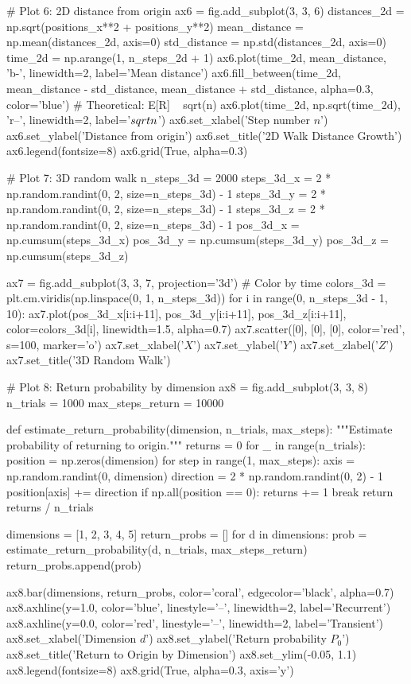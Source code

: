 \documentclass[a4paper, 11pt]{article}
\begin{document}
\begin{pycode}
# Plot 6: 2D distance from origin
ax6 = fig.add_subplot(3, 3, 6)
distances_2d = np.sqrt(positions_x**2 + positions_y**2)
mean_distance = np.mean(distances_2d, axis=0)
std_distance = np.std(distances_2d, axis=0)
time_2d = np.arange(1, n_steps_2d + 1)
ax6.plot(time_2d, mean_distance, 'b-', linewidth=2, label='Mean distance')
ax6.fill_between(time_2d, mean_distance - std_distance, mean_distance + std_distance,
                  alpha=0.3, color='blue')
# Theoretical: E[R] ~ sqrt(n)
ax6.plot(time_2d, np.sqrt(time_2d), 'r--', linewidth=2, label='$\\sqrt{n}$')
ax6.set_xlabel('Step number $n$')
ax6.set_ylabel('Distance from origin')
ax6.set_title('2D Walk Distance Growth')
ax6.legend(fontsize=8)
ax6.grid(True, alpha=0.3)

# Plot 7: 3D random walk
n_steps_3d = 2000
steps_3d_x = 2 * np.random.randint(0, 2, size=n_steps_3d) - 1
steps_3d_y = 2 * np.random.randint(0, 2, size=n_steps_3d) - 1
steps_3d_z = 2 * np.random.randint(0, 2, size=n_steps_3d) - 1
pos_3d_x = np.cumsum(steps_3d_x)
pos_3d_y = np.cumsum(steps_3d_y)
pos_3d_z = np.cumsum(steps_3d_z)

ax7 = fig.add_subplot(3, 3, 7, projection='3d')
# Color by time
colors_3d = plt.cm.viridis(np.linspace(0, 1, n_steps_3d))
for i in range(0, n_steps_3d - 1, 10):
    ax7.plot(pos_3d_x[i:i+11], pos_3d_y[i:i+11], pos_3d_z[i:i+11],
             color=colors_3d[i], linewidth=1.5, alpha=0.7)
ax7.scatter([0], [0], [0], color='red', s=100, marker='o')
ax7.set_xlabel('$X$')
ax7.set_ylabel('$Y$')
ax7.set_zlabel('$Z$')
ax7.set_title('3D Random Walk')

# Plot 8: Return probability by dimension
ax8 = fig.add_subplot(3, 3, 8)
n_trials = 1000
max_steps_return = 10000

def estimate_return_probability(dimension, n_trials, max_steps):
    """Estimate probability of returning to origin."""
    returns = 0
    for _ in range(n_trials):
        position = np.zeros(dimension)
        for step in range(1, max_steps):
            axis = np.random.randint(0, dimension)
            direction = 2 * np.random.randint(0, 2) - 1
            position[axis] += direction
            if np.all(position == 0):
                returns += 1
                break
    return returns / n_trials

dimensions = [1, 2, 3, 4, 5]
return_probs = []
for d in dimensions:
    prob = estimate_return_probability(d, n_trials, max_steps_return)
    return_probs.append(prob)

ax8.bar(dimensions, return_probs, color='coral', edgecolor='black', alpha=0.7)
ax8.axhline(y=1.0, color='blue', linestyle='--', linewidth=2, label='Recurrent')
ax8.axhline(y=0.0, color='red', linestyle='--', linewidth=2, label='Transient')
ax8.set_xlabel('Dimension $d$')
ax8.set_ylabel('Return probability $P_0$')
ax8.set_title('Return to Origin by Dimension')
ax8.set_ylim(-0.05, 1.1)
ax8.legend(fontsize=8)
ax8.grid(True, alpha=0.3, axis='y')


\end{pycode}
\end{document}
